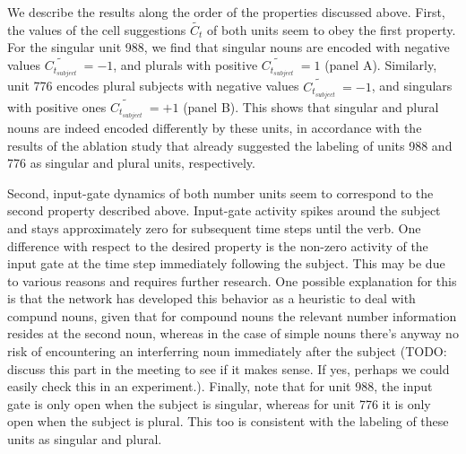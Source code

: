 We describe the results along the order of the properties discussed above. First, the values of the cell suggestions $\tilde{C_t}$ of both units seem to obey the first property. For the singular unit 988, we find that singular nouns are encoded with negative values $\tilde{C_{t_{subject}}}~=-1$, and plurals with positive $\tilde{C_{t_{subject}}}~=1$ (panel A). Similarly, unit 776 encodes plural subjects with negative values $\tilde{C_{t_{subject}}}~=-1$, and singulars with positive ones $\tilde{C_{t_{subject}}}~=+1$ (panel B). This shows that singular and plural nouns are indeed encoded differently by these units, in accordance with the results of the ablation study that already suggested the labeling of units 988 and 776 as singular and plural units, respectively.

Second, input-gate dynamics of both number units seem to correspond to the second property described above. Input-gate activity spikes around the subject and stays approximately zero for subsequent time steps until the verb. One difference with respect to the desired property is the non-zero activity of the input gate at the time step immediately following the subject. This may be due to various reasons and requires further research. One possible explanation for this is that the network has developed this behavior as a heuristic to deal with compund nouns, given that for compound nouns the relevant number information resides at the second noun, whereas in the case of simple nouns there's anyway no risk of encountering an interferring noun immediately after the subject (TODO: discuss this part in the meeting to see if it makes sense. If yes, perhaps we could easily check this in an experiment.). Finally, note that for unit 988, the input gate is only open when the subject is singular, whereas for unit 776 it is only open when the subject is plural. This too is consistent with the labeling of these units as singular and plural.

